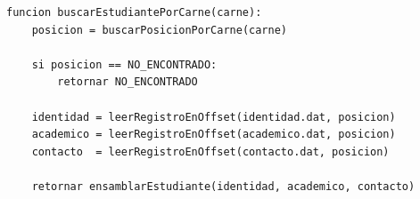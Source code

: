 \begin{lstlisting}[style=pseudocodigo]
funcion buscarEstudiantePorCarne(carne):
    posicion = buscarPosicionPorCarne(carne)

    si posicion == NO_ENCONTRADO:
        retornar NO_ENCONTRADO

    identidad = leerRegistroEnOffset(identidad.dat, posicion)
    academico = leerRegistroEnOffset(academico.dat, posicion)
    contacto  = leerRegistroEnOffset(contacto.dat, posicion)

    retornar ensamblarEstudiante(identidad, academico, contacto)
\end{lstlisting}
